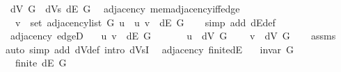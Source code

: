 \begin{isabellebody}
\ \ {\isachardoublequoteopen}dV\ G\ {\isasymequiv}\ dVs\ {\isacharparenleft}{\kern0pt}dE\ G{\isacharparenright}{\kern0pt}{\isachardoublequoteclose}\isanewline
\isanewline
{}\isamarkupfalse%
\ {\isacharparenleft}{\kern0pt}\ adjacency{\isacharparenright}{\kern0pt}\ mem{\isacharunderscore}{\kern0pt}adjacency{\isacharunderscore}{\kern0pt}iff{\isacharunderscore}{\kern0pt}edge{\isacharcolon}{\kern0pt}\isanewline
\ \ \ {\isachardoublequoteopen}v\ {\isasymin}\ set\ {\isacharparenleft}{\kern0pt}adjacency{\isacharunderscore}{\kern0pt}list\ G\ u{\isacharparenright}{\kern0pt}\ {\isasymlongleftrightarrow}\ {\isacharparenleft}{\kern0pt}u{\isacharcomma}{\kern0pt}\ v{\isacharparenright}{\kern0pt}\ {\isasymin}\ dE\ G{\isachardoublequoteclose}\isanewline
%
\isadelimproof
\ \ %
\endisadelimproof
%
\isatagproof
{}\isamarkupfalse%
\ {\isacharparenleft}{\kern0pt}simp\ add{\isacharcolon}{\kern0pt}\ dE{\isacharunderscore}{\kern0pt}def{\isacharparenright}{\kern0pt}%
\endisatagproof
{\isafoldproof}%
%
\isadelimproof
\isanewline
%
\endisadelimproof
%
\isadeliminvisible
\isanewline
%
\endisadeliminvisible
%
\isataginvisible
{}\isamarkupfalse%
\ {\isacharparenleft}{\kern0pt}\ adjacency{\isacharparenright}{\kern0pt}\ edgeD{\isacharcolon}{\kern0pt}\isanewline
\ \ \ {\isachardoublequoteopen}{\isacharparenleft}{\kern0pt}u{\isacharcomma}{\kern0pt}\ v{\isacharparenright}{\kern0pt}\ {\isasymin}\ dE\ G{\isachardoublequoteclose}\isanewline
\ \ \isanewline
\ \ \ \ {\isachardoublequoteopen}u\ {\isasymin}\ dV\ G{\isachardoublequoteclose}\isanewline
\ \ \ \ {\isachardoublequoteopen}v\ {\isasymin}\ dV\ G{\isachardoublequoteclose}%
\endisataginvisible
{\isafoldinvisible}%
%
\isadeliminvisible
\isanewline
%
\endisadeliminvisible
%
\isadelimproof
\ \ %
\endisadelimproof
%
\isatagproof
{}\isamarkupfalse%
\ assms\isanewline
\ \ \isamarkupfalse%
\ {\isacharparenleft}{\kern0pt}auto\ simp\ add{\isacharcolon}{\kern0pt}\ dV{\isacharunderscore}{\kern0pt}def\ intro{\isacharcolon}{\kern0pt}\ dVsI{\isacharparenright}{\kern0pt}%
\endisatagproof
{\isafoldproof}%
%
\isadelimproof
\isanewline
%
\endisadelimproof
\isanewline
{}\isamarkupfalse%
\ {\isacharparenleft}{\kern0pt}\ adjacency{\isacharparenright}{\kern0pt}\ finite{\isacharunderscore}{\kern0pt}dE{\isacharcolon}{\kern0pt}\isanewline
\ \ \ {\isachardoublequoteopen}invar\ G{\isachardoublequoteclose}\isanewline
\ \ \ {\isachardoublequoteopen}finite\ {\isacharparenleft}{\kern0pt}dE\ G{\isacharparenright}{\kern0pt}{\isachardoublequoteclose}\isanewline

\end{isabellebody}
